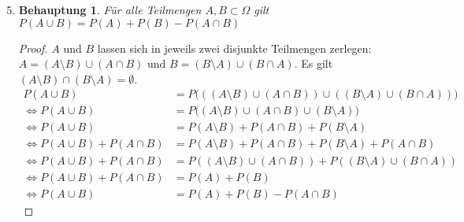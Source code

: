 \documentclass[a4paper]{scrartcl}
\newtheorem*{behaupt}{Behauptung}
\newcommand{\gdw}{\Leftrightarrow}
\begin{document}
\begin{enumerate}[label=\bfseries\arabic*.]
\begin{enumerate}[label=(\roman*)]
            \setcounter{enumii}{4}
            \item
                \begin{behaupt}
                    Für alle Teilmengen $A, B \subset \Omega$ gilt
                    $P(A \cup B) = P(A) + P(B) - P(A \cap B)$
                \end{behaupt}
                \begin{proof}
                    $A$ und $B$ lassen sich in jeweils zwei disjunkte Teilmengen
                    zerlegen:
                    $A = (A \setminus B) \cup (A \cap B)$ und
                    $B = (B \setminus A) \cup (B \cap A)$.
                    Es gilt $(A \setminus B) \cap (B \setminus A) = \emptyset$.
                    \begin{equation}
                        \begin{split}
                            P(A \cup B)
                            &= P \Big( ((A \setminus B) \cup (A \cap B))
                            \cup ((B \setminus A) \cup (B \cap A)) \Big) \\
                            \gdw P(A \cup B)
                            &= P \Big( (A \setminus B) \cup (A \cap B)
                            \cup (B \setminus A) \Big) \\
                            \gdw P(A \cup B)
                            &= P(A \setminus B) + P(A \cap B) + P(B \setminus A) \\
                            \gdw P(A \cup B) + P(A \cap B)
                            &= P(A \setminus B) + P(A \cap B)
                            + P(B \setminus A) + P(A \cap B) \\
                            \gdw P(A \cup B) + P(A \cap B)
                            &= P((A \setminus B) \cup (A \cap B))
                            + P((B \setminus A) \cup (B \cap A)) \\
                            \gdw P(A \cup B) + P(A \cap B) &= P(A) + P(B) \\
                            \gdw P(A \cup B) &= P(A) + P(B) -P(A \cap B)
                        \end{split}
                    \end{equation}
                    
                \end{proof}

        \end{enumerate}



\end{enumerate}
\end{document}
